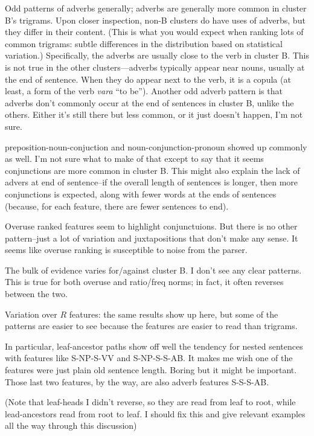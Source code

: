 Odd patterns of adverbs generally; adverbs are generally more common
in cluster B's trigrams. Upon closer inspection, non-B clusters do
have uses of adverbs, but they differ in their content. (This is what
you would expect when ranking lots of common trigrams: subtle
differences in the distribution based on statistical variation.)
Specifically, the adverbs are usually close to the verb in cluster
B. This is not true in the other clusters---adverbs typically appear
near nouns, usually at the end of sentence. When they do appear next
to the verb, it is a copula (at least, a form of the verb {\it vara}
``to be''). Another odd adverb pattern is that adverbs don't commonly
occur at the end of sentences in cluster B, unlike the others. Either
it's still there but less common, or it just doesn't happen, I'm not
sure.

preposition-noun-conjuction and noun-conjunction-pronoun showed up
commonly as well. I'm not sure what to make of that except to say that
it seems conjunctions are more common in cluster B. This might also
explain the lack of advers at end of sentence--if the overall length
of sentences is longer, then more conjunctions is expected, along with
fewer words at the ends of sentences (because, for each feature, there are fewer
sentences to end).

Overuse ranked features seem to highlight conjunctuions. But there is
no other pattern--just a lot of variation and juxtapositions that
don't make any sense. It seems like overuse ranking is susceptible to
noise from the parser.

The bulk of evidence varies for/against cluster B. I don't see any
clear patterns. This is true for both overuse and ratio/freq norms; in
fact, it often reverses between the two.

Variation over $R$ features:  the same results show up here, but some
of the patterns are easier to see because the features are easier to
read than trigrams.

In particular, leaf-ancestor paths show off well the tendency for
nested sentences with features like S-NP-S-VV and S-NP-S-S-AB. It
makes me wish one of the features were just plain old sentence
length. Boring but it might be important. Those last two features, by the
way, are also adverb features S-S-S-AB.

(Note that leaf-heads I didn't reverse, so they are read from leaf to
root, while lead-ancestors read from root to leaf. I should fix this
and give relevant examples all the way through this discussion)

